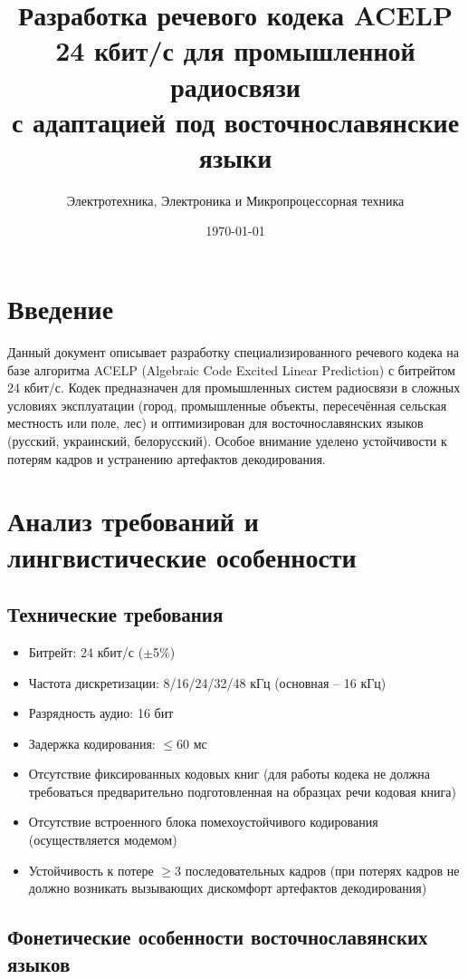 \documentclass{report}
\title{Разработка речевого кодека ACELP 24 кбит/с для промышленной радиосвязи\\ с адаптацией под восточнославянские языки}
\author{Электротехника, Электроника и Микропроцессорная техника}
\date{\today}
\begin{document}
	
	\maketitle
	
	\tableofcontents
	
	\chapter*{Введение}
	Данный документ описывает разработку специализированного речевого кодека на базе алгоритма ACELP (Algebraic Code Excited Linear Prediction) с битрейтом 24 кбит/с. Кодек предназначен для промышленных систем радиосвязи в сложных условиях эксплуатации (город, промышленные объекты, пересечённая сельская местность или поле, лес) и оптимизирован для восточнославянских языков (русский, украинский, белорусский). Особое внимание уделено устойчивости к потерям кадров и устранению артефактов декодирования.
	
	\chapter{Анализ требований и лингвистические особенности}
	\section{Технические требования}
	\begin{itemize}
		\item Битрейт: 24 кбит/с ($\pm$5\%)
		\item Частота дискретизации: 8/16/24/32/48 кГц (основная -- 16 кГц)
		\item Разрядность аудио: 16 бит
		\item Задержка кодирования: $\leqslant$60 мс
		\item Отсутствие фиксированных кодовых книг (для работы кодека не должна требоваться предварительно подготовленная на образцах речи кодовая книга)
		\item Отсутствие встроенного блока помехоустойчивого кодирования (осуществляется модемом)
		\item Устойчивость к потере $\geqslant$3 последовательных кадров (при потерях кадров не должно возникать вызывающих дискомфорт артефактов декодирования)
	\end{itemize}
	
	\section{Фонетические особенности восточнославянских языков}
\end{document}
